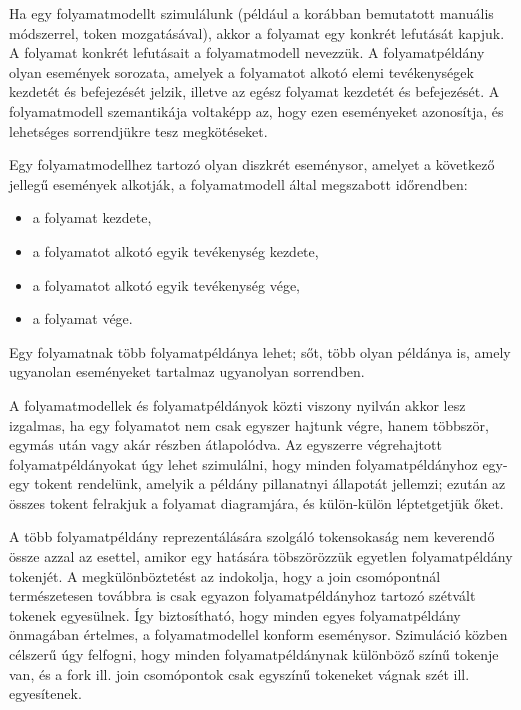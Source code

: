 
Ha egy folyamatmodellt szimulálunk (például a korábban bemutatott manuális módszerrel, token mozgatásával), akkor a folyamat egy konkrét lefutását kapjuk. A folyamat konkrét lefutásait a folyamatmodell  nevezzük. A folyamatpéldány olyan események sorozata, amelyek a folyamatot alkotó elemi tevékenységek kezdetét és befejezését jelzik, illetve az egész folyamat kezdetét és befejezését. A folyamatmodell szemantikája voltaképp az, hogy ezen eseményeket azonosítja, és lehetséges sorrendjükre tesz megkötéseket.

\begin{definicio}
	Egy folyamatmodellhez tartozó  olyan diszkrét eseménysor, amelyet a következő jellegű események alkotják, a folyamatmodell által megszabott időrendben: 	\begin{itemize}
	  \item a folyamat kezdete,
	  \item a folyamatot alkotó egyik tevékenység kezdete, 
	  \item a folyamatot alkotó egyik tevékenység vége, 
	  \item a folyamat vége.
	\end{itemize}
\end{definicio}
\begin{megjegyzes}
Egy folyamatnak több folyamatpéldánya lehet; sőt, több olyan példánya is, amely ugyanolan eseményeket tartalmaz ugyanolyan sorrendben.
\end{megjegyzes}


A folyamatmodellek és folyamatpéldányok közti viszony nyilván akkor lesz izgalmas, ha egy folyamatot nem csak egyszer hajtunk végre, hanem többször, egymás után vagy akár részben átlapolódva. Az egyszerre végrehajtott folyamatpéldányokat úgy lehet szimulálni, hogy minden folyamatpéldányhoz egy-egy tokent rendelünk, amelyik a példány pillanatnyi állapotát jellemzi; ezután az összes tokent felrakjuk a folyamat diagramjára, és külön-külön léptetgetjük őket. 

\begin{megjegyzes}
A több folyamatpéldány reprezentálására szolgáló tokensokaság nem keverendő össze azzal az esettel, amikor egy  hatására töbszörözzük egyetlen folyamatpéldány tokenjét.  A megkülönböztetést az indokolja, hogy a join csomópontnál természetesen továbbra is csak egyazon folyamatpéldányhoz tartozó szétvált tokenek egyesülnek. Így biztosítható, hogy minden egyes folyamatpéldány önmagában értelmes, a folyamatmodellel konform eseménysor. Szimuláció közben célszerű úgy felfogni, hogy minden folyamatpéldánynak különböző színű tokenje van, és a fork ill. join csomópontok csak egyszínű tokeneket vágnak szét ill. egyesítenek. 
\end{megjegyzes}

